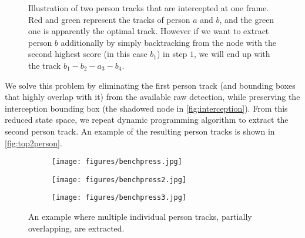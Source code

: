 \begin{figure}[h]
\centering
{}
\caption[Finding the multiple person tracks]{Illustration of two person tracks that are intercepted at one frame. 
Red and green represent the tracks of person $ a $ and $ b $, and the green one is apparently the optimal track. 
However if we want to extract person $ b $ additionally by simply backtracking from the node with the second highest score (in this case $ b_{1} $) in step $ 1 $, we will end up with the track $ b_{1}-b_{2}-a_{3}-b_{4} $.} \label{fig:interception}
\end{figure}

We solve this problem by eliminating the first person track (and bounding boxes that highly overlap with it) from the available raw detection, while preserving the interception bounding box (the shadowed node in \autoref{fig:interception}). 
From this reduced state space, we repeat dynamic programming algorithm to extract the second person track. An example of the resulting person tracks is shown in \autoref{fig:top2person}.
\begin{figure}
\centering
\begin{subfigure}{0.3\linewidth}
\texttt{[image: figures/benchpress.jpg]}
\end{subfigure}%
\begin{subfigure}{0.3\linewidth}
\texttt{[image: figures/benchpress2.jpg]}
\end{subfigure}%
\begin{subfigure}{0.3\linewidth}
\texttt{[image: figures/benchpress3.jpg]}
\end{subfigure} 
\caption[Multiple independent person tracks]{An example where multiple individual person tracks, partially overlapping, are extracted.}\label{fig:top2person}
\end{figure}

